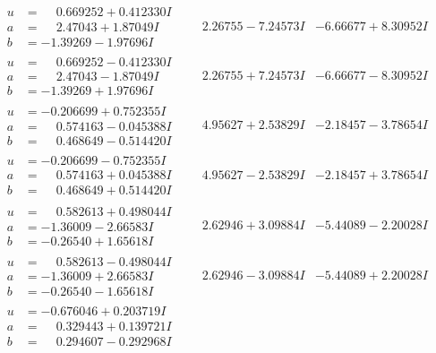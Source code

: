 \documentclass[1p]{elsarticle_modified}
\theoremstyle{definition}
\begin{document}
$$\begin{array}{c|c|c}
\begin{aligned}
u &= \phantom{-}0.669252 + 0.412330 I \\
a &= \phantom{-}2.47043 + 1.87049 I \\
b &= -1.39269 - 1.97696 I\end{aligned}
 & \phantom{-}2.26755 - 7.24573 I & -6.66677 + 8.30952 I \\ \hline\begin{aligned}
u &= \phantom{-}0.669252 - 0.412330 I \\
a &= \phantom{-}2.47043 - 1.87049 I \\
b &= -1.39269 + 1.97696 I\end{aligned}
 & \phantom{-}2.26755 + 7.24573 I & -6.66677 - 8.30952 I \\ \hline\begin{aligned}
u &= -0.206699 + 0.752355 I \\
a &= \phantom{-}0.574163 - 0.045388 I \\
b &= \phantom{-}0.468649 - 0.514420 I\end{aligned}
 & \phantom{-}4.95627 + 2.53829 I & -2.18457 - 3.78654 I \\ \hline\begin{aligned}
u &= -0.206699 - 0.752355 I \\
a &= \phantom{-}0.574163 + 0.045388 I \\
b &= \phantom{-}0.468649 + 0.514420 I\end{aligned}
 & \phantom{-}4.95627 - 2.53829 I & -2.18457 + 3.78654 I \\ \hline\begin{aligned}
u &= \phantom{-}0.582613 + 0.498044 I \\
a &= -1.36009 - 2.66583 I \\
b &= -0.26540 + 1.65618 I\end{aligned}
 & \phantom{-}2.62946 + 3.09884 I & -5.44089 - 2.20028 I \\ \hline\begin{aligned}
u &= \phantom{-}0.582613 - 0.498044 I \\
a &= -1.36009 + 2.66583 I \\
b &= -0.26540 - 1.65618 I\end{aligned}
 & \phantom{-}2.62946 - 3.09884 I & -5.44089 + 2.20028 I \\ \hline\begin{aligned}
u &= -0.676046 + 0.203719 I \\
a &= \phantom{-}0.329443 + 0.139721 I \\
b &= \phantom{-}0.294607 - 0.292968 I\end{aligned}

\end{array}$$
\end{document}
